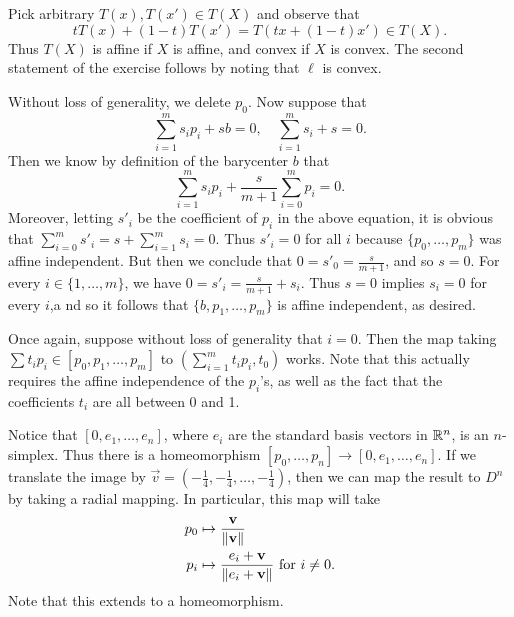 \documentclass[../solutions.tex]{subfiles}
\begin{document}
\begin{exercise} \leavevmode
Pick arbitrary $T(x),T(x')\in T(X)$ and observe that \[tT(x)+(1-t)T(x')=T(tx+(1-t)x')\in T(X).\] Thus $T(X)$ is affine if $X$ is affine, and convex if $X$ is convex. The second statement of the exercise follows by noting that $\ell$ is convex. 
\end{exercise} 

\begin{exercise} \leavevmode
Without loss of generality, we delete $p_0$. Now suppose that \[\sum_{i=1}^ms_ip_i+sb=0,\quad\sum_{i=1}^ms_i+s=0.\] Then we know by definition of the barycenter $b$ that \[\sum_{i=1}^ms_ip_i+\frac s{m+1}\sum_{i=0}^mp_i=0.\] Moreover, letting $s'_i$ be the coefficient of $p_i$ in the above equation, it is obvious that $\sum_{i=0}^ms'_i=s+\sum_{i=1}^ms_i=0$. Thus $s'_i=0$ for all $i$ because $\{p_0,\dots,p_m\}$ was affine independent. But then we conclude that $0=s'_0=\frac s{m+1}$, and so $s=0$. For every $i\in\{1,\dots,m\}$, we have $0=s'_i=\frac s{m+1}+s_i$. Thus $s=0$ implies $s_i=0$ for every $i$,a nd so it follows that $\{b,p_1,\dots,p_m\}$ is affine independent, as desired.
\end{exercise} 

\begin{exercise} \leavevmode
Once again, suppose without loss of generality that $i=0$. Then the map taking $\sum t_ip_i\in[p_0,p_1,\dots,p_m]$ to $\left(\sum_{i=1}^mt_ip_i,t_0\right)$ works. Note that this actually requires the affine independence of the $p_i$'s, as well as the fact that the coefficients $t_i$ are all between 0 and 1. 
\end{exercise} 

\begin{exercise} \leavevmode
Notice that $[0,e_1,\dots,e_n]$, where $e_i$ are the standard basis vectors in $\mathbb{R}^n$, is an $n$-simplex. Thus there is a homeomorphism $[p_0,\dots,p_n]\to[0,e_1,\dots,e_n]$. If we translate the image by $\vec v=(-\frac14,-\frac14,\dots,-\frac14)$, then we can map the result to $D^n$ by taking a radial mapping. In particular, this map will take \begin{align*}p_0&\mapsto\frac{\mathbf v}{\lVert\mathbf v\rVert}\\p_i&\mapsto\frac{e_i+\mathbf v}{\lVert e_i+\mathbf v\rVert}~\text{for}~i\ne0.\end{align*} Note that this extends to a homeomorphism. 
\end{exercise} 
\end{document}
